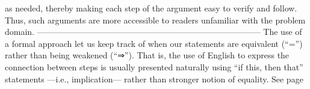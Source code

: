 \documentclass[11pt]{article}
\begin{document}
as needed, thereby making each step of the argument easy to verify and follow. Thus, such arguments are more accessible to readers unfamiliar with the problem domain.  --------------------------------------------------------------------------------  The use of a formal approach let us keep track of when our statements are equivalent (“=”) rather than being weakened (“⇒”). That is, the use of English to express the connection between steps is usually presented naturally using “if this, then that” statements ---i.e., implication--- rather than stronger notion of equality. See page \pageref{org-special-block-extras-glossary-declaration-site-Calculational_Proof}
\end{document}

